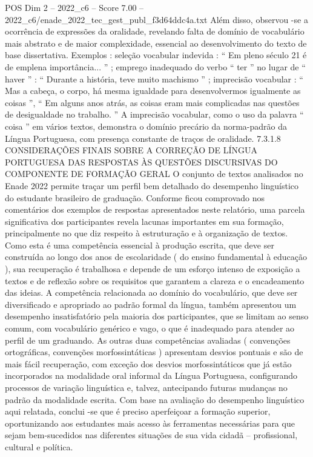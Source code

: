 \begin{textsample}{POS Dim 2 – 2022\_c6 – Score 7.00 – 2022\_c6/enade\_2022\_tec\_gest\_publ\_f3d64ddc4a.txt}
Além disso, observou -se a ocorrência de expressões da oralidade, revelando falta de domínio de vocabulário mais abstrato e de maior complexidade, essencial ao desenvolvimento do texto de base dissertativa.
Exemplos : seleção vocabular indevida : “ Em pleno século 21 é de emplena importância... ” ; emprego inadequado do verbo “ ter ” no lugar de “ haver ” : “ Durante a história, teve muito machismo ” ; imprecisão vocabular : “ Mas a cabeça, o corpo, há mesma igualdade para desenvolvermos igualmente as coisas ”, “ Em alguns anos atrás, as coisas eram mais complicadas nas questões de desigualdade no trabalho. ” A imprecisão vocabular, como o uso da palavra “ coisa ” em vários textos, demonstra o domínio precário da norma-padrão da Língua Portuguesa, com presença constante de traços de oralidade. 7.3.1.8 CONSIDERAÇÕES FINAIS SOBRE A CORREÇÃO DE LÍNGUA PORTUGUESA DAS RESPOSTAS ÀS QUESTÕES DISCURSIVAS DO COMPONENTE DE FORMAÇÃO GERAL O conjunto de textos analisados no Enade 2022 permite traçar um perfil bem detalhado do desempenho linguístico do estudante brasileiro de graduação.
Conforme ficou comprovado nos comentários dos exemplos de respostas apresentados neste relatório, uma parcela significativa dos participantes revela lacunas importantes em sua formação, principalmente no que diz respeito à estruturação e à organização de textos.
Como esta é uma competência essencial à produção escrita, que deve ser construída ao longo dos anos de escolaridade ( do ensino fundamental à educação ), sua recuperação é trabalhosa e depende de um esforço intenso de exposição a textos e de reflexão sobre os requisitos que garantem a clareza e o encadeamento das ideias.
A competência relacionada ao domínio do vocabulário, que deve ser diversificado e apropriado ao padrão formal da língua, também apresentou um desempenho insatisfatório pela maioria dos participantes, que se limitam ao senso comum, com vocabulário genérico e vago, o que é inadequado para atender ao perfil de um graduando.
As outras duas competências avaliadas ( convenções ortográficas, convenções morfossintáticas ) apresentam desvios pontuais e são de mais fácil recuperação, com exceção dos desvios morfossintáticos que já estão incorporados na modalidade oral informal da Língua Portuguesa, configurando processos de variação linguística e, talvez, antecipando futuras mudanças no padrão da modalidade escrita.
Com base na avaliação do desempenho linguístico aqui relatada, conclui -se que é preciso aperfeiçoar a formação superior, oportunizando aos estudantes mais acesso às ferramentas necessárias para que sejam bem-sucedidos nas diferentes situações de sua vida cidadã – profissional, cultural e política.

\end{textsample}

